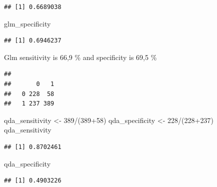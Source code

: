 \documentclass[
]{article}
\newenvironment{Shaded}{\begin{snugshade}}{\end{snugshade}}
\newcommand{\CommentTok}[1]{\textcolor[rgb]{0.56,0.35,0.01}{\textit{#1}}}
\newcommand{\DecValTok}[1]{\textcolor[rgb]{0.00,0.00,0.81}{#1}}
\newcommand{\FunctionTok}[1]{\textcolor[rgb]{0.00,0.00,0.00}{#1}}
\newcommand{\NormalTok}[1]{#1}
\newcommand{\OtherTok}[1]{\textcolor[rgb]{0.56,0.35,0.01}{#1}}
\newcommand{\SpecialCharTok}[1]{\textcolor[rgb]{0.00,0.00,0.00}{#1}}
\begin{document}
\begin{verbatim}
## [1] 0.6689038
\end{verbatim}

\begin{Shaded}
\begin{Highlighting}[]
\NormalTok{glm\_specificity}
\end{Highlighting}
\end{Shaded}

\begin{verbatim}
## [1] 0.6946237
\end{verbatim}

Glm sensitivity is 66,9 \% and specificity is 69,5 \%

\begin{Shaded}
\end{Shaded}

\begin{verbatim}
##    
##       0   1
##   0 228  58
##   1 237 389
\end{verbatim}

\begin{Shaded}
\begin{Highlighting}[]
\NormalTok{qda\_sensitivity }\OtherTok{\textless{}{-}} \DecValTok{389}\SpecialCharTok{/}\NormalTok{(}\DecValTok{389}\SpecialCharTok{+}\DecValTok{58}\NormalTok{)}
\NormalTok{qda\_specificity }\OtherTok{\textless{}{-}} \DecValTok{228}\SpecialCharTok{/}\NormalTok{(}\DecValTok{228}\SpecialCharTok{+}\DecValTok{237}\NormalTok{)}
\NormalTok{qda\_sensitivity}
\end{Highlighting}
\end{Shaded}

\begin{verbatim}
## [1] 0.8702461
\end{verbatim}

\begin{Shaded}
\begin{Highlighting}[]
\NormalTok{qda\_specificity}
\end{Highlighting}
\end{Shaded}

\begin{verbatim}
## [1] 0.4903226
\end{verbatim}
\end{document}
